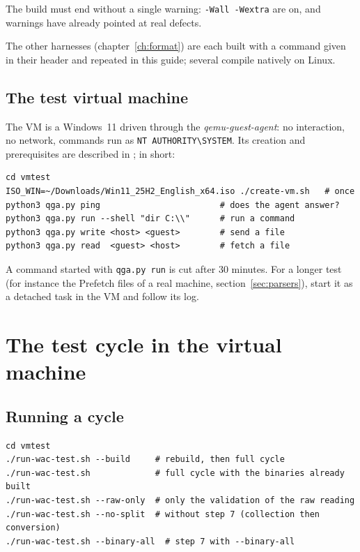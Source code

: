 \documentclass[11pt,a4paper,oneside]{report}
\begin{document}
The build must end without a single warning: \texttt{-Wall -Wextra} are on, and
warnings have already pointed at real defects.

The other harnesses (chapter~\ref{ch:format}) are each built with a command given
in their header and repeated in this guide; several compile natively on Linux.

\section{The test virtual machine}

The VM is a Windows~11 driven through the \emph{qemu-guest-agent}: no
interaction, no network, commands run as
\texttt{NT AUTHORITY\textbackslash SYSTEM}. Its creation and prerequisites are
described in ; in short:

\begin{lstlisting}
cd vmtest
ISO_WIN=~/Downloads/Win11_25H2_English_x64.iso ./create-vm.sh   # once
python3 qga.py ping                        # does the agent answer?
python3 qga.py run --shell "dir C:\\"      # run a command
python3 qga.py write <host> <guest>        # send a file
python3 qga.py read  <guest> <host>        # fetch a file
\end{lstlisting}

\begin{note}
A command started with \texttt{qga.py run} is cut after 30 minutes. For a longer
test (for instance the Prefetch files of a real machine,
section~\ref{sec:parsers}), start it as a detached task in the VM and follow its
log.
\end{note}

\chapter{The test cycle in the virtual machine}\label{ch:vm}

\section{Running a cycle}

\begin{lstlisting}
cd vmtest
./run-wac-test.sh --build     # rebuild, then full cycle
./run-wac-test.sh             # full cycle with the binaries already built
./run-wac-test.sh --raw-only  # only the validation of the raw reading
./run-wac-test.sh --no-split  # without step 7 (collection then conversion)
./run-wac-test.sh --binary-all  # step 7 with --binary-all
\end{lstlisting}
\end{document}
